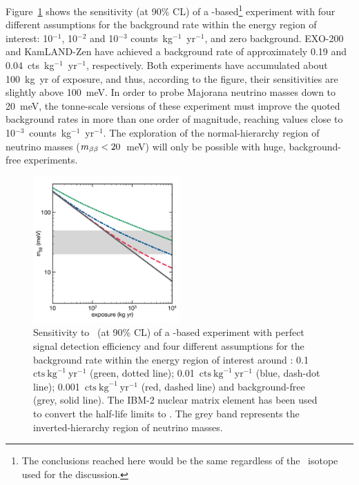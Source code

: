 \documentclass{PoS}
\begin{document}
Figure~\ref{fig:SensitivityXeVsBackground} shows the sensitivity (at 90\% CL) of a \XE-based\footnote{The conclusions reached here would be the same regardless of the \bb\ isotope used for the discussion.} experiment with four different assumptions for the background rate within the energy region of interest: 10$^{-1}$, 10$^{-2}$ and 10$^{-3}$ counts~kg$^{-1}$~yr$^{-1}$, and zero background. EXO-200 and KamLAND-Zen have achieved a background rate of approximately 0.19 and 0.04~cts~kg$^{-1}$~yr$^{-1}$, respectively. Both experiments have accumulated about 100~kg~yr of exposure, and thus, according to the figure, their sensitivities are slightly above 100~meV. In order to probe Majorana neutrino masses down to 20~meV, the tonne-scale versions of these experiment must improve the quoted background rates in more than one order of magnitude, reaching values close to 10$^{-3}$~counts~kg$^{-1}$~yr$^{-1}$. The exploration of the normal-hierarchy region of neutrino masses ($m_{\beta\beta}<20$~meV) will only be possible with huge, background-free experiments.


\begin{figure}
\centering
\includegraphics[width=0.5\textwidth]{img/SensitivityXeVsBackground.pdf}
\caption{Sensitivity to \mbb\ (at 90\% CL) of a \XE-based experiment with perfect signal detection efficiency and four different assumptions for the background rate within the energy region of interest around \Qbb: 0.1~$\mathrm{cts}~\mathrm{kg}^{-1}~\mathrm{yr}^{-1}$ (green, dotted line); 0.01~$\mathrm{cts}~\mathrm{kg}^{-1}~\mathrm{yr}^{-1}$ (blue, dash-dot line); 0.001~$\mathrm{cts}~\mathrm{kg}^{-1}~\mathrm{yr}^{-1}$ (red, dashed line) and background-free (grey, solid line). The IBM-2 nuclear matrix element \cite{Barea:2013bz} has been used to convert the half-life limits to \mbb. The grey band represents the inverted-hierarchy region of neutrino masses.} \label{fig:SensitivityXeVsBackground}
\end{figure}
\end{document}
